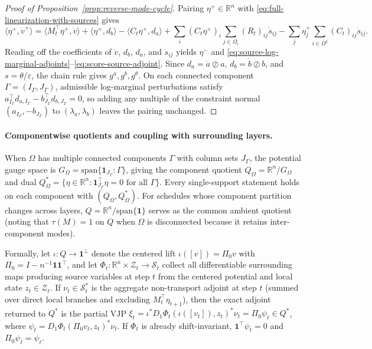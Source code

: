 \documentclass[10pt]{article}
\newcommand{\one}{\mathbf{1}}
\begin{document}
\begin{proof}[Proof of Proposition~\ref{prop:reverse-mode-cycle}]
Pairing $\eta^+ \in \mathbb{R}^n$ with \eqref{eq:full-linearization-with-sources} gives
\[
  \langle \eta^+, \dot v^+ \rangle
  = \langle M_t^\top \eta^+, \dot v \rangle
  + \langle \eta^+, d_b \rangle
  - \langle C_t \eta^+, d_a \rangle
  + \sum_i (C_t \eta^+)_i \sum_{j \in \Omega_i} (R_t)_{ij}\dot s_{ij}
  - \sum_j \eta^+_j \sum_{i \in \Omega^j} (C_t)_{ij}\dot s_{ij}.
\]
Reading off the coefficients of $\dot v$, $d_b$, $d_a$, and $\dot s_{ij}$ yields $\eta^-$ and \eqref{eq:source-log-marginal-adjoints}--\eqref{eq:score-source-adjoint}. Since $d_a = \dot a \oslash a$, $d_b = \dot b \oslash b$, and $s = \theta/\varepsilon$, the chain rule gives $g^a, g^b, g^\theta$. On each connected component $\Gamma = (I_\Gamma, J_\Gamma)$, admissible log-marginal perturbations satisfy $a_{I_\Gamma}^\top d_{a, I_\Gamma} - b_{J_\Gamma}^\top d_{b, J_\Gamma} = 0$, so adding any multiple of the constraint normal $(a_{I_\Gamma}, -b_{J_\Gamma})$ to $(\lambda_a, \lambda_b)$ leaves the pairing unchanged.
\end{proof}

\paragraph{Componentwise quotients and coupling with surrounding layers.}
When $\Omega$ has multiple connected components $\Gamma$ with column sets $J_\Gamma$, the potential gauge space is $G_\Omega = \mathrm{span}\{\one_{J_\Gamma} : \Gamma\}$, giving the component quotient $Q_\Omega = \mathbb{R}^n / G_\Omega$ and dual $Q_\Omega^* = \{\eta \in \mathbb{R}^n : \one_{J_\Gamma}^\top \eta = 0 \text{ for all } \Gamma\}$. Every single-support statement holds on each component with $(Q_\Omega, Q_\Omega^*)$. For schedules whose component partition changes across layers, $Q = \mathbb{R}^n/\mathrm{span}\{\one\}$ serves as the common ambient quotient (noting that $\tau(M) = 1$ on $Q$ when $\Omega$ is disconnected because it retains inter-component modes).

Formally, let $\iota : Q \to \one^\perp$ denote the centered lift $\iota([v]) = \Pi_0 v$ with $\Pi_0 = I - n^{-1}\one\one^\top$, and let $\Phi_t : \mathbb{R}^n \times \mathcal{Z}_t \to \mathcal{S}_t$ collect all differentiable surrounding maps producing source variables at step $t$ from the centered potential and local state $z_t \in \mathcal{Z}_t$. If $\nu_t \in \mathcal{S}_t^*$ is the aggregate non-transport adjoint at step $t$ (summed over direct local branches and excluding $M_t^\top \eta_{t+1}$), then the exact adjoint returned to $Q^*$ is the partial VJP $\xi_t = \iota^* D_1\Phi_t(\iota([v_t]), z_t)^* \nu_t = \Pi_0 \psi_t \in Q^*$, where $\psi_t = D_1\Phi_t(\Pi_0 v_t, z_t)^* \nu_t$. If $\Phi_t$ is already shift-invariant, $\one^\top\psi_t = 0$ and $\Pi_0\psi_t = \psi_t$.
\end{document}
